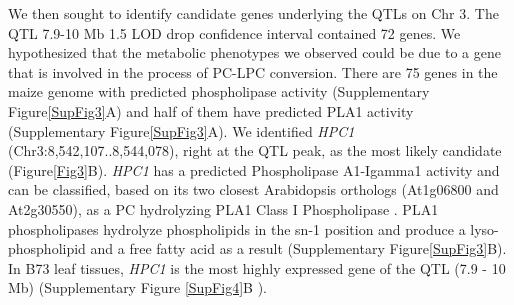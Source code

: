 \documentclass[9pt,twocolumn,twoside,lineno]{BioRxiv}
\begin{document}
We then sought to identify candidate genes underlying the QTLs on Chr 3.
The QTL 7.9-10 Mb 1.5 LOD drop confidence interval contained 72 genes. 
We hypothesized that the metabolic phenotypes we observed could be due to a gene that is involved in the process of PC-LPC conversion.  
There are 75 genes in the maize genome with predicted phospholipase activity (Supplementary Figure\ref{SupFig3}A) and half of them have predicted PLA1 activity (Supplementary Figure\ref{SupFig3}A).  
We identified \textit{HPC1} (Chr3:8,542,107..8,544,078), right at the QTL peak, as the most likely candidate (Figure\ref{Fig3}B). 
\textit{HPC1} has a predicted Phospholipase A1-Igamma1 activity and can be classified, based on its two closest Arabidopsis orthologs (At1g06800 and At2g30550), as a PC hydrolyzing PLA1 Class I Phospholipase \cite{Ryu2004-iv}. 
PLA1 phospholipases hydrolyze phospholipids in the sn-1 position and produce a lyso-phospholipid and a free fatty acid as a result (Supplementary Figure\ref{SupFig3}B). 
In B73 leaf tissues, \textit{HPC1} is the most highly expressed gene of the QTL (7.9 - 10 Mb) (Supplementary Figure \ref{SupFig4}B \cite{Stelpflug2016-vr}).
\end{document}
